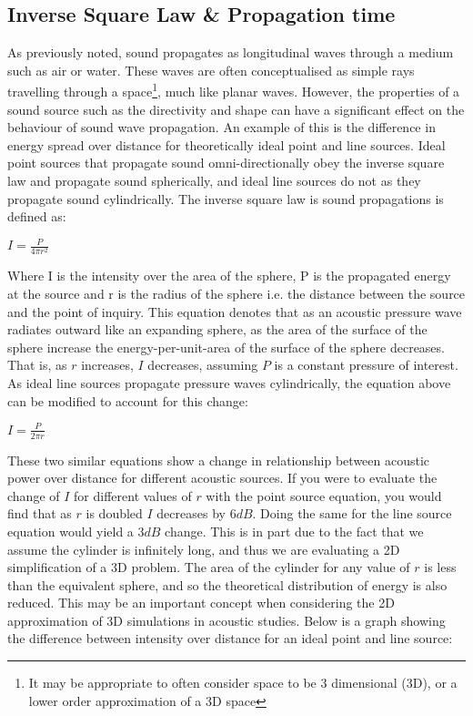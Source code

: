 \subsection{Inverse Square Law \& Propagation time}
As previously noted, sound propagates as longitudinal waves through a medium such as air or water. These waves are often conceptualised as simple rays~\cite{beranek1954acoustics} travelling through a space\footnote{It may be appropriate to often consider space to be 3 dimensional (3D), or a lower order approximation of a 3D space}, much like planar waves. However, the properties of a sound source such as the directivity and shape can have a significant effect on the behaviour of sound wave propagation. An example of this is the difference in energy spread over distance for theoretically ideal point and line sources. Ideal point sources that propagate sound omni-directionally obey the inverse square law and propagate sound spherically, and ideal line sources do not as they propagate sound cylindrically. The inverse square law is sound propagations is defined as:\\
\begin{center}
$I = \frac{P}{4 \pi r^2}$\\
\end{center}
Where I is the intensity over the area of the sphere, P is the propagated energy at the source and r is the radius of the sphere i.e. the distance between the source and the point of inquiry. This equation denotes that as an acoustic pressure wave radiates outward like an expanding sphere, as the area of the surface of the sphere increase the energy-per-unit-area of the surface of the sphere decreases. That is, as $r$ increases, $ I $ decreases, assuming $ P $ is a constant pressure of interest.\\
As ideal line sources propagate pressure waves cylindrically, the equation above can be modified to account for this change:\\
\begin{center}
$I = \frac{P}{2 \pi r}$\\
\end{center}
These two similar equations show a change in relationship between acoustic power over distance for different acoustic sources. If you were to evaluate the change of $I$ for different values of $r$ with the point source equation, you would find that as $r$ is doubled $I$ decreases by $6dB$. Doing the same for the line source equation would yield a $3dB$ change. This is in part due to the fact that we assume the cylinder is infinitely long, and thus we are evaluating a 2D simplification of a 3D problem. The area of the cylinder for any value of $r$ is less than the equivalent sphere, and so the theoretical distribution of energy is also reduced. This may be an important concept when considering the 2D approximation of 3D simulations in acoustic studies. Below is a graph showing the difference between intensity over distance for an ideal point and line source:\\

